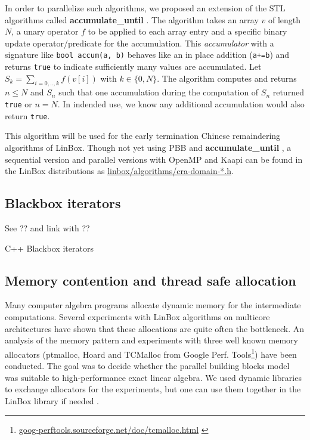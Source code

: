 \documentclass{article}
\newcommand{\linbox}{{\sc LinBox}\xspace}
\newcommand{\kaapi}{{\sc Kaapi}\xspace}
\newcommand{\accumulatewhile}{ \textbf{accumulate\_until} }
\newcommand{\Accumulatewhile}{ \textbf{Accumulate\_until} }
\begin{document}
In order to parallelize such algorithms, we proposed an extension of
the STL algorithms called \accumulatewhile.
The algorithm takes an array $v$ of length $N$, a unary
operator $f$ to be applied to each array entry and a specific binary
update operator/predicate for the accumulation.
This {\em accumulator} with a signature like \verb!bool accum(a, b)! behaves like an in place addition (\verb!a+=b!) and
returns \texttt{true} to indicate sufficiently many values are accumulated.
Let $S_k = \sum_{i=0,..,k} f( v[i])$ with 
$k \in \{0,N\}$.  The algorithm computes and returns $n \leq N$ and
$S_n$ such that one accumulation during the computation of $S_n$
returned \texttt{true} or $n = N$.  In indended use, we know any additional accumulation would also return \texttt{true}.

This algorithm will be used 
for the early termination Chinese remaindering algorithms of
\linbox. Though not yet using PBB and \accumulatewhile, a
sequential version and parallel versions with OpenMP and
\kaapi can be found in the \linbox distributions as 
\url{linbox/algorithms/cra-domain-*.h}.


\subsection{Blackbox iterators}

See \cite[\S 11.3]{jgd:2000:these} ?? 
and link with \cite{jgd:2010:ffspmvgpu} ??

\begin{algorithm}[ht]
\caption{C++ Blackbox iterators}\label{alg:bbit}
\end{algorithm}


\subsection{Memory contention and thread safe allocation}
Many computer algebra programs allocate dynamic memory for the
intermediate computations. Several experiments with \linbox
algorithms on multicore architectures have shown that these
allocations are quite often the bottleneck.
An analysis of the memory pattern and experiments with three well
known memory allocators 
(ptmalloc, Hoard and TCMalloc from Google
Perf.
Tools\footnote{\url{goog-perftools.sourceforge.net/doc/tcmalloc.html}
  \cite{tcmalloc}})
have been conducted. The goal was to decide whether the parallel
building blocks model was suitable to high-performance exact linear
algebra. We used dynamic libraries to exchange allocators for the
experiments, but one can use them together in the \linbox library if
needed \cite[\S 7]{kaltofen:2005:memory}.
\end{document}
